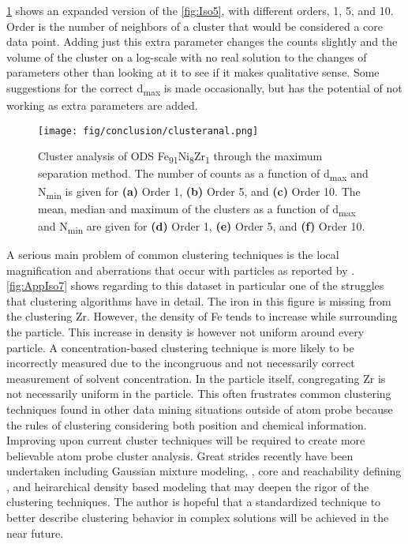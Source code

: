 \ref{fig:clusteranal} shows an expanded version of the \ref{fig:Iso5}, with different orders, 1, 5, and 10. Order is the number of neighbors of a cluster that would be considered a core data point. Adding just this extra parameter changes the counts slightly and the volume of the cluster on a log-scale with no real solution to the changes of parameters other than looking at it to see if it makes qualitative sense. Some suggestions for the correct d\textsubscript{max} is made occasionally, but has the potential of not working as extra parameters are added.

\begin{figure}
	\centering
	\texttt{[image: fig/conclusion/clusteranal.png]}
	\caption[Cluster analysis of ODS Fe\textsubscript{91}Ni\textsubscript{8}Zr\textsubscript{1} through the maximum separation method.]{Cluster analysis of ODS Fe\textsubscript{91}Ni\textsubscript{8}Zr\textsubscript{1} through the maximum separation method. The number of counts as a function of d\textsubscript{max} and N\textsubscript{min} is given for \textbf{(a)} Order 1, \textbf{(b)} Order 5, and \textbf{(c)} Order 10. The mean, median and maximum of the clusters as a function of d\textsubscript{max} and N\textsubscript{min} are given for \textbf{(d)} Order 1, \textbf{(e)} Order 5, and \textbf{(f)} Order 10.}
	\label{fig:clusteranal}
\end{figure}

A serious main problem of common clustering techniques is the local magnification and aberrations that occur with particles as reported by \cite{RN2620}. \ref{fig:AppIso7} shows regarding to this dataset in particular one of the struggles that clustering algorithms have in detail. The iron in this figure is missing from the clustering Zr. However, the density of
  Fe tends to increase while surrounding the particle. This increase in density is however not uniform around every particle. A concentration-based clustering technique is more likely to be incorrectly measured due to the incongruous and not necessarily correct measurement of solvent concentration. In the particle itself, congregating Zr is not necessarily uniform in the particle. This often frustrates common clustering techniques found in other data mining situations outside of atom probe because the rules of clustering considering both position and chemical information. Improving upon current cluster techniques will be required to create more believable atom probe cluster analysis.
Great strides recently have been undertaken including Gaussian mixture modeling, \cite{RN632}, core and reachability defining \cite{RN2630}, and heirarchical density based modeling \cite{RN217} that may deepen the rigor of the clustering techniques. The author is hopeful that a standardized technique to better describe clustering behavior in complex solutions will be achieved in the near future.

